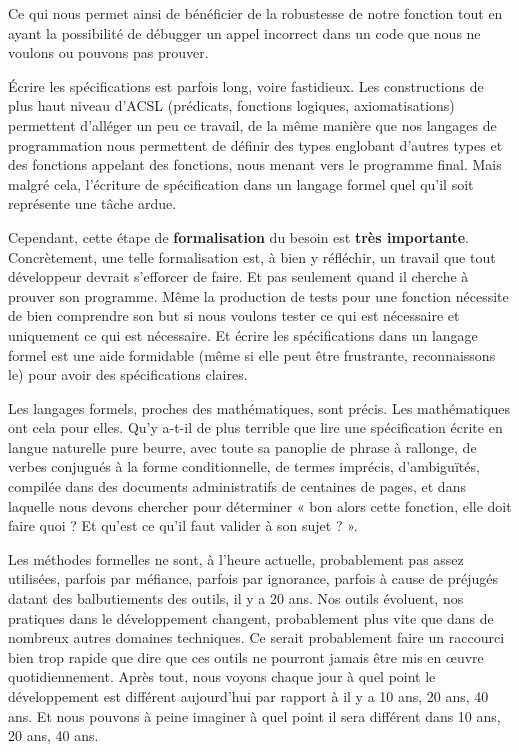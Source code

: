 Ce qui nous permet ainsi de bénéficier de la robustesse de notre fonction tout en
ayant la possibilité de débugger un appel incorrect dans un code que nous ne
voulons ou pouvons pas prouver.



Écrire les spécifications est parfois long, voire fastidieux. Les constructions
de plus haut niveau d'ACSL (prédicats, fonctions logiques, axiomatisations)
permettent d'alléger un peu ce travail, de la même manière que nos langages de
programmation nous permettent de définir des types englobant d'autres types et
des fonctions appelant des fonctions, nous menant vers le programme final. Mais
malgré cela, l'écriture de spécification dans un langage formel quel qu'il soit
représente une tâche ardue.



Cependant, cette étape de \textbf{formalisation} du besoin est \textbf{très importante}.
Concrètement, une telle formalisation est, à bien y réfléchir, un travail que
tout développeur devrait s'efforcer de faire. Et pas seulement quand il cherche
à prouver son programme. Même la production de tests pour une fonction
nécessite de bien comprendre son but si nous voulons tester ce qui est nécessaire
et uniquement ce qui est nécessaire. Et écrire les spécifications dans un
langage formel est une aide formidable (même si elle peut être frustrante,
reconnaissons le) pour avoir des spécifications claires.



Les langages formels, proches des mathématiques, sont précis. Les mathématiques
ont cela pour elles. Qu'y a-t-il de plus terrible que lire une spécification
écrite en langue naturelle pure beurre, avec toute sa panoplie de phrase à
rallonge, de verbes conjugués à la forme conditionnelle, de termes imprécis,
d'ambiguïtés, compilée dans des documents administratifs de centaines de pages,
et dans laquelle nous devons chercher pour déterminer « bon alors cette fonction,
elle doit faire quoi ? Et qu'est ce qu'il faut valider à son sujet ? ».



Les méthodes formelles ne sont, à l'heure actuelle, probablement pas assez
utilisées, parfois par méfiance, parfois par ignorance, parfois à cause de
préjugés datant des balbutiements des outils, il y a 20 ans. Nos outils
évoluent, nos pratiques dans le développement changent, probablement plus
vite que dans de nombreux autres domaines techniques. Ce serait probablement
faire un raccourci bien trop rapide que dire que ces outils ne pourront
jamais être mis en œuvre quotidiennement. Après tout, nous voyons chaque jour
à quel point le développement est différent aujourd'hui par rapport à il y a
10 ans, 20 ans, 40 ans. Et nous pouvons à peine imaginer à quel point il sera
différent dans 10 ans, 20 ans, 40 ans.



